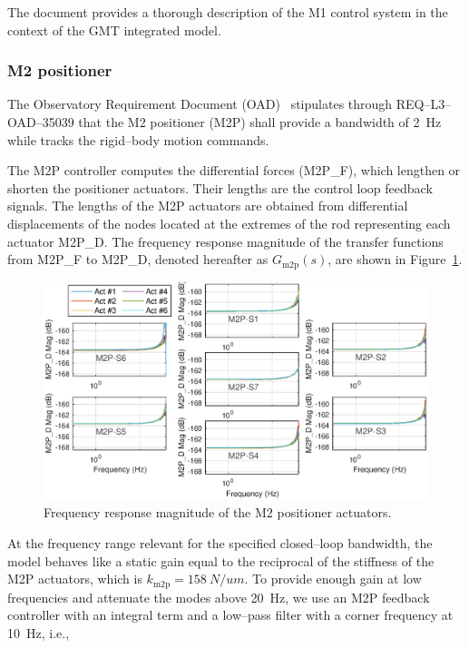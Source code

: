  The document \cite{GMT.DOC.05153} provides a thorough description of the M1
 control system in the context of the GMT integrated model.

\subsubsection{M2 positioner}
\label{sec:m2-ctrlr}


The Observatory Requirement Document (OAD)~\cite{OAD_verF2020} stipulates through REQ--L3--OAD--35039 that the M2 positioner (M2P) shall provide a bandwidth of \SI{2}{Hz} while tracks the rigid--body motion commands.


The M2P controller computes the differential forces (\textsf{M2P\_F}), which lengthen or shorten the positioner actuators. Their lengths are the control loop feedback signals. The lengths of the M2P actuators are obtained from differential displacements of the nodes located at the extremes of the rod representing each actuator \textsf{M2P\_D}. The frequency response magnitude of the transfer functions from \textsf{M2P\_F} to \textsf{M2P\_D}, denoted hereafter as $G_\text{m2p}(s)$, are shown in Figure~\ref{fig:M2P_G}. %
%
\begin{figure}[!hbt]
    \vspace{6pt}
    \centering
    \includegraphics[width=\textwidth]{./ctrl_sec_images/M2P_G.eps}
    \caption{Frequency response magnitude of the M2 positioner actuators.}
    \label{fig:M2P_G}
\end{figure}
%
At the frequency range relevant for the specified closed--loop bandwidth, the model behaves like a static gain equal to the reciprocal of the stiffness of the M2P actuators, which is $k_\text{m2p}=\SI{158}{N/um}$. %
To provide enough gain at low frequencies and attenuate the modes above \SI{20}{Hz}, we use an M2P feedback controller with an integral term and a low--pass filter with a corner frequency at \SI{10}{Hz}, i.e.,

